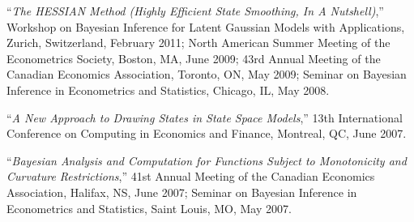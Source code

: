 \documentclass[12pt]{article}
\begin{document}
``{\it The HESSIAN Method (Highly Efficient State Smoothing, In A Nutshell)},''
Workshop on Bayesian Inference for Latent Gaussian Models with Applications,
Zurich, Switzerland,
February 2011;
North American Summer Meeting of the Econometrics Society,
Boston, MA,
June 2009;
43rd Annual Meeting of the Canadian Economics Association,
Toronto, ON,
May 2009;
Seminar on Bayesian Inference in Econometrics and Statistics,
Chicago, IL,
May 2008.

``{\it A New Approach to Drawing States in State Space Models},''
13th International Conference on Computing in Economics and Finance,
Montreal, QC,
June 2007.

``{\it Bayesian Analysis and Computation for Functions Subject to Monotonicity and Curvature Restrictions},''
41st Annual Meeting of the Canadian Economics Association,
Halifax, NS,
June 2007;
Seminar on Bayesian Inference in Econometrics and Statistics,
Saint Louis, MO,
May 2007.





\end{document}
